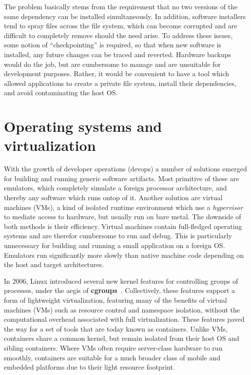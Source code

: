 \documentclass[12pt,initial,twoside,maitrise]{dms}
\numberwithin{equation}{section}
\numberwithin{table}{chapter}
\numberwithin{figure}{chapter}
\begin{document}
The problem basically stems from the requirement that no two versions of the same dependency can be installed simultaneously. In addition, software installers tend to spray files across the file system, which can become corrupted and are difficult to completely remove should the need arise. To address these issues, some notion of ``checkpointing'' is required, so that when new software is installed, any future changes can be traced and reverted. Hardware backups would do the job, but are cumbersome to manage and are unsuitable for development purposes. Rather, it would be convenient to have a tool which allowed applications to create a private file system, install their dependencies, and avoid contaminating the host OS.

\section{Operating systems and virtualization}\label{sec:os-and-virtualization}

With the growth of developer operations (devops) a number of solutions emerged for building and running generic software artifacts. Most primitive of these are emulators, which completely simulate a foreign processor architecture, and thereby any software which runs ontop of it. Another solution are virtual machines (VMs), a kind of isolated runtime environment which use a \textit{hypervisor} to mediate access to hardware, but usually run on bare metal. The downside of both methods is their efficiency. Virtual machines contain full-fledged operating systems and are therefor cumbersome to run and debug. This is particularly unnecessary for building and running a small application on a foreign OS. Emulators run significantly more slowly than native machine code depending on the host and target architectures.

In 2006, Linux introduced several new kernel features for controlling groups of processes, under the aegis of \textbf{cgroups}~\citep{menage2007adding}. Collectively, these features support a form of lightweight virtualization, featuring many of the benefits of virtual machines (VMs) such as resource control and namespace isolation, without the computational overhead associated with full virtualization. These features paved the way for a set of tools that are today known as containers. Unlike VMs, containers share a common kernel, but remain isolated from their host OS and sibling containers. Where VMs often require server-class hardware to run smoothly, containers are suitable for a much broader class of mobile and embedded platforms due to their light resource footprint.
\end{document}
